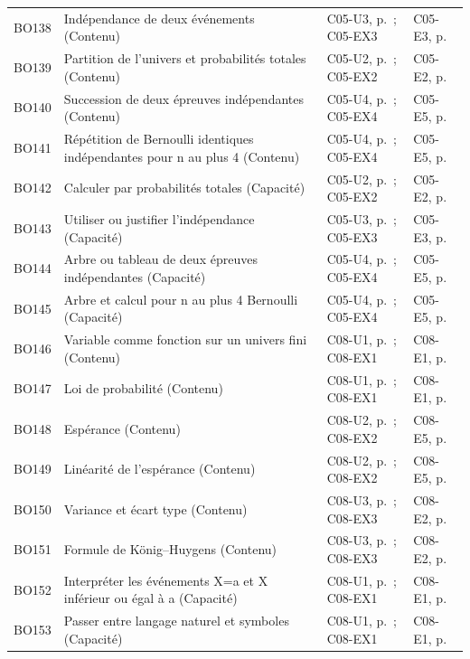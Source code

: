 \begin{longtable}{p{.1\linewidth}p{.43\linewidth}p{.19\linewidth}p{.16\linewidth}}
BO138 & Indépendance de deux événements (Contenu) & C05-U3, p.\,\pageref{C05-U3} ; C05-EX3 & C05-E3, p.\,\pageref{C05-E3} \\
BO139 & Partition de l’univers et probabilités totales (Contenu) & C05-U2, p.\,\pageref{C05-U2} ; C05-EX2 & C05-E2, p.\,\pageref{C05-E2} \\
BO140 & Succession de deux épreuves indépendantes (Contenu) & C05-U4, p.\,\pageref{C05-U4} ; C05-EX4 & C05-E5, p.\,\pageref{C05-E5} \\
BO141 & Répétition de Bernoulli identiques indépendantes pour n au plus 4 (Contenu) & C05-U4, p.\,\pageref{C05-U4} ; C05-EX4 & C05-E5, p.\,\pageref{C05-E5} \\
BO142 & Calculer par probabilités totales (Capacité) & C05-U2, p.\,\pageref{C05-U2} ; C05-EX2 & C05-E2, p.\,\pageref{C05-E2} \\
BO143 & Utiliser ou justifier l’indépendance (Capacité) & C05-U3, p.\,\pageref{C05-U3} ; C05-EX3 & C05-E3, p.\,\pageref{C05-E3} \\
BO144 & Arbre ou tableau de deux épreuves indépendantes (Capacité) & C05-U4, p.\,\pageref{C05-U4} ; C05-EX4 & C05-E5, p.\,\pageref{C05-E5} \\
BO145 & Arbre et calcul pour n au plus 4 Bernoulli (Capacité) & C05-U4, p.\,\pageref{C05-U4} ; C05-EX4 & C05-E5, p.\,\pageref{C05-E5} \\
BO146 & Variable comme fonction sur un univers fini (Contenu) & C08-U1, p.\,\pageref{C08-U1} ; C08-EX1 & C08-E1, p.\,\pageref{C08-E1} \\
BO147 & Loi de probabilité (Contenu) & C08-U1, p.\,\pageref{C08-U1} ; C08-EX1 & C08-E1, p.\,\pageref{C08-E1} \\
BO148 & Espérance (Contenu) & C08-U2, p.\,\pageref{C08-U2} ; C08-EX2 & C08-E5, p.\,\pageref{C08-E5} \\
BO149 & Linéarité de l’espérance (Contenu) & C08-U2, p.\,\pageref{C08-U2} ; C08-EX2 & C08-E5, p.\,\pageref{C08-E5} \\
BO150 & Variance et écart type (Contenu) & C08-U3, p.\,\pageref{C08-U3} ; C08-EX3 & C08-E2, p.\,\pageref{C08-E2} \\
BO151 & Formule de König–Huygens (Contenu) & C08-U3, p.\,\pageref{C08-U3} ; C08-EX3 & C08-E2, p.\,\pageref{C08-E2} \\
BO152 & Interpréter les événements X=a et X inférieur ou égal à a (Capacité) & C08-U1, p.\,\pageref{C08-U1} ; C08-EX1 & C08-E1, p.\,\pageref{C08-E1} \\
BO153 & Passer entre langage naturel et symboles (Capacité) & C08-U1, p.\,\pageref{C08-U1} ; C08-EX1 & C08-E1, p.\,\pageref{C08-E1} \\

\end{longtable}
